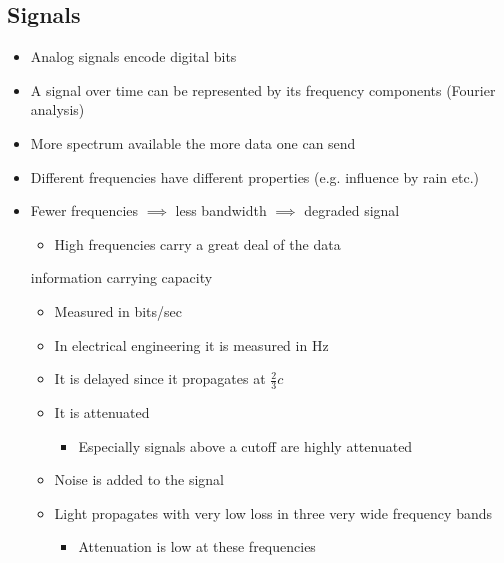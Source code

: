 \subsection{Signals}
\begin{itemize}
    \item Analog signals encode digital bits
    \item A signal over time can be represented by its frequency components (Fourier analysis)
    \item More spectrum available the more data one can send
    \item Different frequencies have different properties (e.g. influence by rain etc.)
     \item Fewer frequencies $\implies$ less bandwidth $\implies$ degraded signal
        \begin{itemize}
            \item High frequencies carry a great deal of the data
        \end{itemize}
     information carrying capacity
        \begin{itemize}
            \item Measured in bits/sec
            \item In electrical engineering it is measured in Hz
        \end{itemize}
        \begin{itemize}
            \item It is delayed since it propagates at $\frac{2}{3}c$
            \item It is attenuated
                \begin{itemize}
                    \item Especially signals above a cutoff are highly attenuated
                \end{itemize}
            \item Noise is added to the signal
        \end{itemize}
        \begin{itemize}
            \item Light propagates with very low loss in three very wide frequency bands
                \begin{itemize}
                    \item Attenuation is low at these frequencies
                \end{itemize}
        \end{itemize}

\end{itemize}
